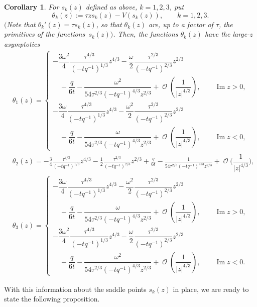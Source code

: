 \documentclass[10pt,a4paper]{amsart}
\DeclareMathOperator{\OO}{\mathcal{O}}
\numberwithin{equation}{section}
\newtheorem{Corollary}[Theorem]{Corollary}
\begin{document}
 \begin{Corollary}
 For $s_k(z)$ defined as above, $k=1,2,3$, put
 \begin{equation*}
 \theta_k(z) := \tau z s_k(z) - V(s_k(z)),\qquad k=1,2,3.
 \end{equation*}
 $($Note that $\theta_k'(z) = \tau s_k(z)$, so that $\theta_k(z)$ are, up to a factor of $\tau$, the primitives of the functions~$s_k(z))$. Then, the functions $\theta_k(z)$ have the large-$z$ asymptotics
 \begin{align}\label{theta-z-asymp}
 &\theta_1(z) =
 \begin{cases}
 -\dfrac{3\omega^2}{4} \dfrac{\tau^{4/3}}{(-tq^{-1})^{1/3}}z^{4/3} - \dfrac{\omega}{2}\dfrac{\tau^{2/3}}{(-tq^{-1})^{2/3}}z^{2/3} \\
 \quad {}+ \dfrac{q}{6t}- \dfrac{\omega^2}{54\tau^{2/3}(-tq^{-1})^{4/3}z^{2/3}} + \OO\left(\dfrac{1}{|z|^{4/3}}\right), \qquad \operatorname{Im} z>0,\\[1.5mm]
 -\dfrac{3\omega}{4} \dfrac{\tau^{4/3}}{(-tq^{-1})^{1/3}}z^{4/3} - \dfrac{\omega^{2}}{2}\dfrac{\tau^{2/3}}{(-tq^{-1})^{2/3}}z^{2/3} \\
 \quad{}+ \dfrac{q}{6t}- \dfrac{\omega}{54\tau^{2/3}(-tq^{-1})^{4/3}z^{2/3}} + \OO\left(\dfrac{1}{|z|^{4/3}}\right), \qquad \operatorname{Im} z<0,
 \end{cases}\\
 &\theta_2(z) = -\frac{3}{4} \frac{\tau^{4/3}}{(-tq^{-1})^{1/3}}z^{4/3} - \frac{1}{2}\frac{\tau^{2/3}}{(-tq^{-1})^{2/3}}z^{2/3} + \frac{q}{6t} - \frac{1}{54\tau^{2/3}(-tq^{-1})^{4/3}z^{2/3}} + \OO\biggl(\!\dfrac{1}{|z|^{4/3}}\!\biggr),\nonumber\\
 &\theta_3(z) =
 \begin{cases}
 -\dfrac{3\omega}{4} \dfrac{\tau^{4/3}}{(-tq^{-1})^{1/3}}z^{4/3} - \dfrac{\omega^{2}}{2}\dfrac{\tau^{2/3}}{(-tq^{-1})^{2/3}}z^{2/3} \\
 \quad{}+ \dfrac{q}{6t}- \dfrac{\omega}{54\tau^{2/3}(-tq^{-1})^{4/3}z^{2/3}} + \OO\left(\dfrac{1}{|z|^{4/3}}\right), \qquad \operatorname{Im} z>0,\\[1.5mm]
 -\dfrac{3\omega^2}{4} \dfrac{\tau^{4/3}}{(-tq^{-1})^{1/3}}z^{4/3} - \dfrac{\omega}{2}\dfrac{\tau^{2/3}}{(-tq^{-1})^{2/3}}z^{2/3} \\
 \quad{} + \dfrac{q}{6t}- \dfrac{\omega^2}{54\tau^{2/3}(-tq^{-1})^{4/3}z^{2/3}} + \OO\left(\dfrac{1}{|z|^{4/3}}\right), \qquad \operatorname{Im} z<0.\nonumber
 \end{cases}
 \end{align}
 \end{Corollary}
With this information about the saddle points $s_k(z)$ in place, we are ready to state the following proposition.
\end{document}
